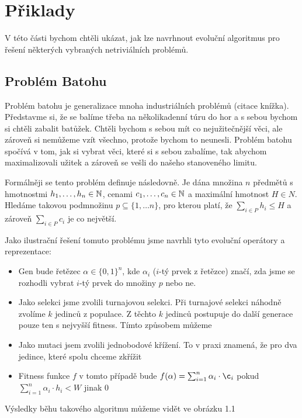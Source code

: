 \section{Přiklady}

V této části bychom chtěli ukázat, jak lze navrhnout evoluční algoritmus pro řešení některých vybraných netriviálních problémů.

\subsection{Problém Batohu}

Problém batohu je generalizace mnoha industriálních problémů (citace knížka). Představme si, že se balíme třeba na několikadenní túru do hor a s sebou bychom si chtěli zabalit batůžek. Chtěli bychom s sebou mít co nejužitečnější věci, ale zároveň si nemůžeme vzít všechno, protože bychom to neunesli. Problém batohu spočívá v tom, jak si vybrat věci, které si s sebou zabalíme, tak abychom maximalizovali užitek a zároveň se vešli do našeho stanoveného limitu.

Formálněji se tento problém definuje následovně. Je dána množina $n$ předmětů s hmotnostmi $h_1, \dots, h_n \in \mathbb{N}$, cenami $c_1, \dots, c_n \in \mathbb{N}$ a maximální hmotnost $H \in N$. Hledáme takovou podmnožinu $p \subseteq \{1, \dots n\}$, pro kterou platí, že $\sum_{i \in P} h_i \leq H$ a zároveň $\sum_{i \in P} c_i$ je co největší.

Jako ilustrační řešení tomuto problému jsme navrhli tyto evoluční operátory a reprezentace:
\begin{itemize}
    \item Gen bude řetězec $\alpha \in \{0,1\}^n$, kde $\alpha_i$ ($i$-tý prvek z řetězce) značí, zda jsme se rozhodli vybrat $i$-tý prvek do množiny $p$ nebo ne.
    \item Jako selekci jsme zvolili turnajovou selekci. Při turnajové selekci náhodně zvolíme $k$ jedinců z populace. Z těchto $k$ jedinců postupuje do další generace pouze ten s nejvyšší fitness. Tímto způsobem můžeme
    \item Jako mutaci jsem zvolili jednobodové křížení. To v praxi znamená, že pro dva jedince, které spolu chceme zkřížit
    \item Fitness funkce $f$ v tomto případě bude $f(\alpha) = \sum_{i=1}^n \alpha_i \cdot \c_i$ pokud $\sum_{i=1}^n \alpha_i \cdot h_i < W$ jinak $0$
\end{itemize}

Výsledky běhu takového algoritmu můžeme vidět ve obrázku 1.1

